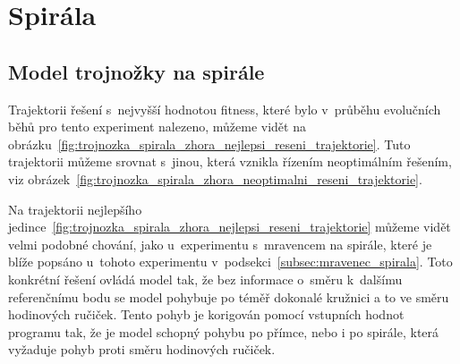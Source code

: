 
\clearpage

\section{Spirála}
\subsection{Model trojnožky na spirále}

Trajektorii řešení s~nejvyšší hodnotou fitness, které bylo v~průběhu evolučních běhů pro tento experiment nalezeno, můžeme vidět na obrázku~\ref{fig:trojnozka_spirala_zhora_nejlepsi_reseni_trajektorie}.
Tuto trajektorii můžeme srovnat s~jinou, která vznikla řízením neoptimálním řešením, viz obrázek~\ref{fig:trojnozka_spirala_zhora_neoptimalni_reseni_trajektorie}.

Na trajektorii nejlepšího jedince~\ref{fig:trojnozka_spirala_zhora_nejlepsi_reseni_trajektorie} můžeme vidět velmi podobné chování, jako u~experimentu s~mravencem na spirále, které je blíže popsáno u~tohoto experimentu v~podsekci~\ref{subsec:mravenec_spirala}.
Toto konkrétní řešení ovládá model tak, že bez informace o~směru k~dalšímu referenčnímu bodu se model pohybuje po téměř dokonalé kružnici a to ve směru hodinových ručiček.
Tento pohyb je korigován pomocí vstupních hodnot programu tak, že je model schopný pohybu po přímce, nebo i po spirále, která vyžaduje pohyb proti směru hodinových ručiček.

